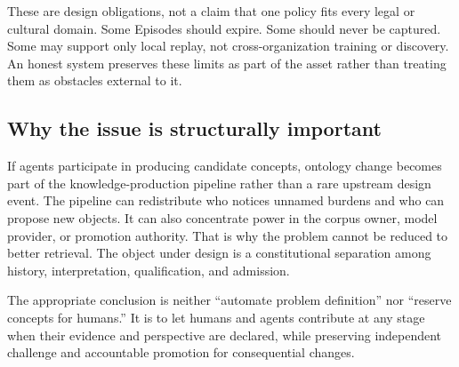 These are design obligations, not a claim that one policy fits every legal or
cultural domain. Some Episodes should expire. Some should never be captured.
Some may support only local replay, not cross-organization training or
discovery. An honest system preserves these limits as part of the asset rather
than treating them as obstacles external to it.

\subsection{Why the issue is structurally important}

If agents participate in producing candidate concepts, ontology change becomes
part of the knowledge-production pipeline rather than a rare upstream design
event. The pipeline can redistribute who notices unnamed burdens and who can
propose new objects. It can also concentrate power in the corpus owner, model
provider, or promotion authority. That is why the problem cannot be reduced to
better retrieval. The object under design is a constitutional separation among
history, interpretation, qualification, and admission.

The appropriate conclusion is neither ``automate problem definition'' nor
``reserve concepts for humans.'' It is to let humans and agents contribute at
any stage when their evidence and perspective are declared, while preserving
independent challenge and accountable promotion for consequential changes.
